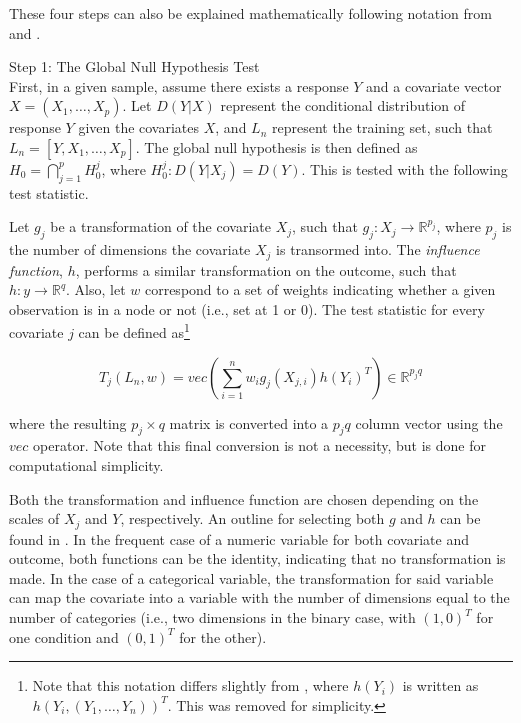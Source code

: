 	These four steps can also be explained mathematically following notation from  and . 

\vspace{8ex}

\noindent Step 1: The Global Null Hypothesis Test \\

First, in a given sample, assume there exists a response $Y$ and a covariate vector $X = (X_1, \ldots, X_p)$. Let $D(Y|X)$ represent the conditional distribution of response $Y$ given the covariates $X$, and $L_n$ represent the training set, such that $L_n = [Y, X_1, \ldots, X_p]$. The global null hypothesis is then defined as $H_0 = \bigcap_{j=1}^{p}H_0^j$, where $H_0^j: D(Y|X_j) = D(Y)$. This is tested with the following test statistic. 


Let $g_j$ be a transformation of the covariate $X_j$, such that $g_j:X_j \rightarrow \mathbb{R}^{p_j}$, where $p_j$ is the number of dimensions the covariate $X_j$ is transormed into. The \textit{influence function}, $h$, performs a similar transformation on the outcome, such that $h: y \rightarrow \mathbb{R}^q$. Also, let $w$ correspond to a set of weights indicating whether a given observation is in a node or not (i.e., set at 1 or 0). The test statistic for every covariate $j$ can be defined as\footnote{Note that this notation differs slightly from , where $h(Y_i)$ is written as $h(Y_i, (Y_1, \ldots, Y_n))^T$. This was removed for simplicity.}

\begin{equation}
\label{eq:teststat}
T_j(L_n, w) = vec\left ( \sum_{i=1}^{n}w_ig_j(X_{j,i})h(Y_i)^T \right ) \in \mathbb{R}^{p_jq}
\end{equation}


\noindent where the resulting $p_j \times q$ matrix is converted into a $p_jq$ column vector using the $vec$ operator. Note that this final conversion is not a necessity, but is done for computational simplicity. 


 Both the transformation and influence function are chosen depending on the scales of $X_j$ and $Y$, respectively. An outline for selecting both $g$ and $h$ can be found in . In the frequent case of a numeric variable for both covariate and outcome, both functions can be the identity, indicating that no transformation is made. In the case of a categorical variable, the transformation for said variable can map the covariate into a variable with the number of dimensions equal to the number of categories (i.e., two dimensions in the binary case, with $(1, 0)^T$ for one condition and $(0, 1)^T$ for the other). 


